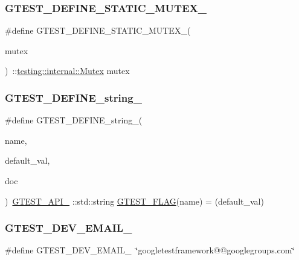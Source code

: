 \subsubsection{\texorpdfstring{GTEST\_DEFINE\_STATIC\_MUTEX\_}{GTEST\_DEFINE\_STATIC\_MUTEX\_}}
{\footnotesize\ttfamily \#define G\+T\+E\+S\+T\+\_\+\+D\+E\+F\+I\+N\+E\+\_\+\+S\+T\+A\+T\+I\+C\+\_\+\+M\+U\+T\+E\+X\+\_\+(\begin{DoxyParamCaption}\item[{}]{mutex }\end{DoxyParamCaption})~\+::\mbox{\hyperlink{classtesting_1_1internal_1_1Mutex}{testing\+::internal\+::\+Mutex}} mutex}

\mbox{\label{gtest-port_8h_a885e18fe217a6e85553d408b99252c12}} 
\subsubsection{\texorpdfstring{GTEST\_DEFINE\_string\_}{GTEST\_DEFINE\_string\_}}
{\footnotesize\ttfamily \#define G\+T\+E\+S\+T\+\_\+\+D\+E\+F\+I\+N\+E\+\_\+string\+\_\+(\begin{DoxyParamCaption}\item[{}]{name,  }\item[{}]{default\+\_\+val,  }\item[{}]{doc }\end{DoxyParamCaption})~\mbox{\hyperlink{gtest-port_8h_aa73be6f0ba4a7456180a94904ce17790}{G\+T\+E\+S\+T\+\_\+\+A\+P\+I\+\_\+}} \+::std\+::string \mbox{\hyperlink{gtest-port_8h_a828f4e34a1c4b510da50ec1563e3562a}{G\+T\+E\+S\+T\+\_\+\+F\+L\+AG}}(name) = (default\+\_\+val)}

\mbox{\label{gtest-port_8h_a21086d276b1a64d6763ee8a94b12c1b8}} 
\subsubsection{\texorpdfstring{GTEST\_DEV\_EMAIL\_}{GTEST\_DEV\_EMAIL\_}}
{\footnotesize\ttfamily \#define G\+T\+E\+S\+T\+\_\+\+D\+E\+V\+\_\+\+E\+M\+A\+I\+L\+\_\+~\char`\"{}googletestframework@@googlegroups.\+com\char`\"{}}

